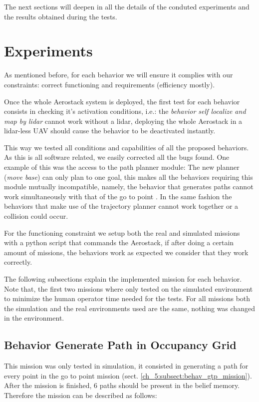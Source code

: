   The next sections will deepen in all the details of the conduted experiments and the results obtained during the tests.

\section{Experiments} \label{ch_5:sect:experiments}

  As mentioned before, for each behavior we will ensure it complies with our constraints: correct functioning and requirements (efficiency mostly).
  
  Once the whole Aerostack system is deployed, the first test for each behavior consists in checking it's activation conditions, i.e.: the \textit{behavior self localize and map by lidar} cannot work without a lidar, deploying the whole Aerostack in a lidar-less UAV should cause the behavior to be deactivated instantly.

  This way we tested all conditions and capabilities of all the proposed behaviors. As this is all software related, we easily corrected all the bugs found. One example of this was the access to the path planner module: The new planner (\textit{move base}) can only plan to one goal, this makes all the behaviors requiring this module mutually incompatible, namely, the behavior that generates paths cannot work simultaneously with that of the go to point . In the same fashion the behaviors that make use of the trajectory planner cannot work together or a collision could occur.

  For the functioning constraint we setup both the real and simulated missions with a python script that commands the Aerostack, if after doing a certain amount of missions, the behaviors work as expected we consider that they work correctly. 
  
  The following subsections explain the implemented mission for each behavior. Note that, the first two missions where only tested on the simulated environment to minimize the human operator time needed for the tests. For all missions both the simulation and the real environments used are the same, nothing was changed in the environment.

  \subsection{Behavior Generate Path in Occupancy Grid} \label{ch_5:subsect:behav_genpath_mission}

    This mission was only tested in simulation, it consisted in generating a path for every point in the go to point mission (sect. \ref{ch_5:subsect:behav_gtp_mission}). After the mission is finished, $6$ paths should be present in the belief memory. Therefore the mission can be described as follows:
    
